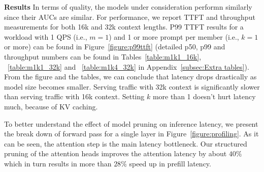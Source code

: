 \noindent \textbf{Results} In terms of quality, the models under consideration performn similarly since their AUCs are similar. For performance, we report TTFT and throughput measurements for both 16k and 32k context lengths. P99 TTFT results for a workload with 1 QPS (i.e., $m=1$) and 1 or more prompt per member (i.e., $k=1$ or more) can be found in Figure~\ref{figure:p99ttft} (detailed p50, p99 and throughput numbers can be found in Tables~\ref{table:m1k1_16k}, ~\ref{table:m1k1_32k} and ~\ref{table:m1k4_32k} in Appendix~\ref{subsec:Extra tables}). From the figure and the tables, we can conclude that latency drops drastically as model size becomes smaller. Serving traffic with 32k context is significantly slower than serving traffic with 16k context. Setting $k$ more than 1 doesn't hurt latency much, because of KV caching. 

To better understand the effect of model pruning on inference latency, we present the break down of forward pass for a single layer in Figure~\ref{figure:profiling}. As it can be seen, the attention step is the main latency bottleneck. Our structured pruning of the attention heads improves the attention latency by about $40\%$ which in turn results in more than $28\%$ speed up in prefill latency.



